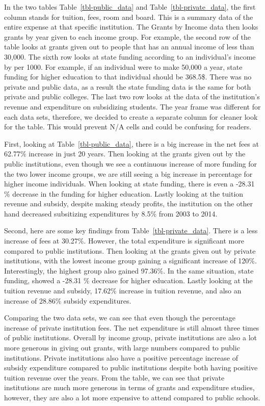 \documentclass[
  letterpaper,
  DIV=11,
  numbers=noendperiod]{scrartcl}
\begin{document}
In the two tables Table~\ref{tbl-public_data} and
Table~\ref{tbl-private_data}, the first column stands for tuition, fees,
room and board. This is a summary data of the entire expense at that
specific institution. The Grants by Income data then looks grants by
year given to each income group. For example, the second row of the
table looks at grants given out to people that has an annual income of
less than 30,000. The sixth row looks at state funding according to an
individual's income by per 1000. For example, if an individual were to
make 50,000 a year, state funding for higher education to that
individual should be 368.5\$. There was no private and public data, as a
result the state funding data is the same for both private and public
colleges. The last two row looks at the data of the institution's
revenue and expenditure on subsidizing students. The year frame was
different for each data sets, therefore, we decided to create a separate
column for cleaner look for the table. This would prevent N/A cells and
could be confusing for readers.

First, looking at Table~\ref{tbl-public_data}, there is a big increase
in the net fees at 62.77\% increase in just 20 years. Then looking at
the grants given out by the public institutions, even though we see a
continuous increase of more funding for the two lower income groups, we
are still seeing a big increase in percentage for higher income
individuals. When looking at state funding, there is even a -28.31 \%
decrease in the funding for higher education. Lastly looking at the
tuition revenue and subsidy, despite making steady profits, the
institution on the other hand decreased subsitizing expenditures by
8.5\% from 2003 to 2014.

Second, here are some key findings from Table~\ref{tbl-private_data}.
There is a less increase of fees at 30.27\%. However, the total
expenditure is significant more compared to public institutions. Then
looking at the grants given out by private institutions, with the lowest
income group gaining a significant increase of 120\%. Interestingly, the
highest group also gained 97.36\%. In the same situation, state funding,
showed a -28.31 \% decrease for higher education. Lastly looking at the
tuition revenue and subsidy, 17.62\% increase in tuition revenue, and
also an increase of 28.86\% subsidy expenditures.

Comparing the two data sets, we can see that even though the percentage
increase of private institution fees. The net expenditure is still
almost three times of public institutions. Overall by income group,
private institutions are also a lot more generous in giving out grants,
with large numbers compared to public institutions. Private institutions
also have a positive percentage increase of subsidy expenditure compared
to public institutions despite both having positive tuition revenue over
the years. From the table, we can see that private institutions are much
more generous in terms of grants and expenditure studies, however, they
are also a lot more expensive to attend compared to public schools.
\end{document}
